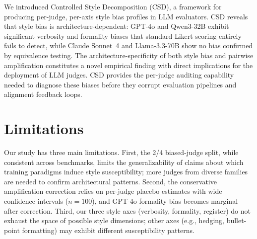 \documentclass[11pt]{article}
\begin{document}
We introduced Controlled Style Decomposition (CSD), a framework for producing per-judge, per-axis style bias profiles in LLM evaluators. CSD reveals that style bias is architecture-dependent: GPT-4o and Qwen3-32B exhibit significant verbosity and formality biases that standard Likert scoring entirely fails to detect, while Claude Sonnet~4 and Llama-3.3-70B show no bias confirmed by equivalence testing. The architecture-specificity of both style bias and pairwise amplification constitutes a novel empirical finding with direct implications for the deployment of LLM judges. CSD provides the per-judge auditing capability needed to diagnose these biases before they corrupt evaluation pipelines and alignment feedback loops.

\section*{Limitations}

Our study has three main limitations. First, the 2/4 biased-judge split, while consistent across benchmarks, limits the generalizability of claims about which training paradigms induce style susceptibility; more judges from diverse families are needed to confirm architectural patterns. Second, the conservative amplification correction relies on per-judge placebo estimates with wide confidence intervals ($n=100$), and GPT-4o formality bias becomes marginal after correction. Third, our three style axes (verbosity, formality, register) do not exhaust the space of possible style dimensions; other axes (e.g., hedging, bullet-point formatting) may exhibit different susceptibility patterns.



\end{document}
